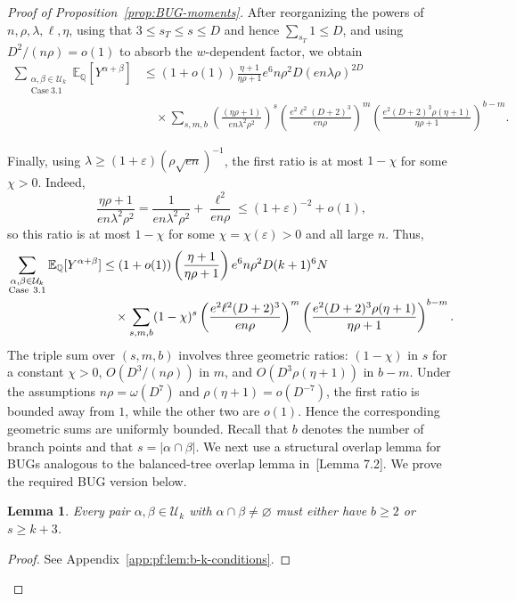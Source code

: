 \documentclass[11pt, letterpaper]{article}
\newtheorem{lemma}[theorem]{Lemma}
\numberwithin{equation}{section}
\newcommand{\E}{\mathbb{E}}
\newcommand{\QQ}{\mathbb{Q}}
\newcommand{\cU}{\mathcal{U}}
\begin{document}
\begin{proof}[Proof of Proposition~\ref{prop:BUG-moments}]
After reorganizing the powers of $n,\rho,\lambda,\ell,\eta$, using that
$3\le s_T\le s\le D$ and hence $\sum_{s_T}1\le D$, and using
$D^2/(n\rho)=o(1)$ to absorb the $w$-dependent factor, we obtain
{\small
\begin{align}
\sum_{\substack{\alpha,\beta\in\cU_k\\ \mathrm{Case\ 3.1}}}
\E_\QQ[Y^{\alpha+\beta}]
&\le
(1+o(1))\frac{\eta+1}{\eta\rho+1}
e^6 n\rho^2D(en\lambda\rho)^{2D}\nonumber\\
&\quad\times
\sum_{s,m,b}
\left(\frac{(\eta\rho+1)}{en\lambda^2\rho^2}\right)^s
\left(\frac{e^2\ell^2(D+2)^3}{en\rho}\right)^m
\left(\frac{e^2(D+2)^3\rho(\eta+1)}{\eta\rho+1}\right)^{b-m}.
\end{align}}

Finally, using $\lambda\ge (1+\varepsilon)(\rho\sqrt{en})^{-1}$, the first ratio is at most $1-\chi$ for some $\chi>0$. Indeed,
\[
\frac{\eta\rho+1}{en\lambda^2\rho^2}
=
\frac{1}{en\lambda^2\rho^2}
+
\frac{\ell^2}{en\rho}
\le (1+\varepsilon)^{-2}+o(1),
\]
so this ratio is at most $1-\chi$ for some $\chi=\chi(\varepsilon)>0$ and all
large $n$. Thus,
 \begin{align} 
\notag  \sum_{\substack{\alpha,\beta\in\cU_k\\ \mathrm{Case\ 3.1}}}
\E_\QQ[Y^{\alpha+\beta}] &\leq(1+o(1)) \left(\frac{\eta+1}{\eta\rho+1}\right) e^6n\rho^2D(k+1)^6N\\
   &\label{eq:final-bound} \quad \times \sum_{s,m,b} (1-\chi)^s \left(\frac{e^2\ell^2(D+2)^3}{en\rho}\right)^m\left(\frac{e^2(D+2)^3\rho(\eta+1)}{\eta\rho+1}\right)^{b-m}.
   \end{align}
 The triple sum over $(s,m,b)$ involves three geometric ratios: $(1-\chi)$ in $s$ for a constant $\chi>0$, $O(D^3/(n\rho))$ in $m$, and $O(D^3\rho(\eta+1))$ in $b-m$. Under the assumptions $n\rho=\omega(D^7)$ and $\rho(\eta+1)=o(D^{-7})$, the first ratio is bounded away from $1$, while the other two are $o(1)$. Hence the corresponding geometric sums are uniformly bounded. Recall that $b$ denotes the number of branch points and that $s = |\alpha \cap \beta|$. We next use a structural overlap lemma for BUGs analogous to the balanced-tree overlap lemma in~\cite{sohn2025sharp}[Lemma 7.2]. We prove the required BUG version below.
   \begin{lemma}\label{lem:b-k-conditions}Every pair $\alpha,\beta \in \cU_k$ with $\alpha \cap \beta \neq \varnothing$ must either have $b\geq 2$ or $s\geq k+3$.
   \end{lemma}
\begin{proof}
    See Appendix~\ref{app:pf:lem:b-k-conditions}.
\end{proof}


\end{proof}
\end{document}
